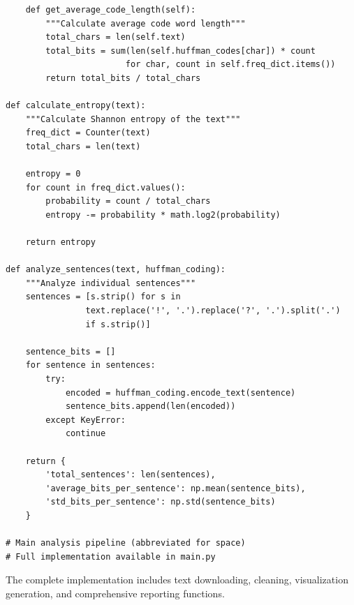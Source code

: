\documentclass[11pt,a4paper]{article}
\begin{document}
\begin{lstlisting}
    def get_average_code_length(self):
        """Calculate average code word length"""
        total_chars = len(self.text)
        total_bits = sum(len(self.huffman_codes[char]) * count 
                        for char, count in self.freq_dict.items())
        return total_bits / total_chars

def calculate_entropy(text):
    """Calculate Shannon entropy of the text"""
    freq_dict = Counter(text)
    total_chars = len(text)
    
    entropy = 0
    for count in freq_dict.values():
        probability = count / total_chars
        entropy -= probability * math.log2(probability)
    
    return entropy

def analyze_sentences(text, huffman_coding):
    """Analyze individual sentences"""
    sentences = [s.strip() for s in 
                text.replace('!', '.').replace('?', '.').split('.') 
                if s.strip()]
    
    sentence_bits = []
    for sentence in sentences:
        try:
            encoded = huffman_coding.encode_text(sentence)
            sentence_bits.append(len(encoded))
        except KeyError:
            continue
    
    return {
        'total_sentences': len(sentences),
        'average_bits_per_sentence': np.mean(sentence_bits),
        'std_bits_per_sentence': np.std(sentence_bits)
    }

# Main analysis pipeline (abbreviated for space)
# Full implementation available in main.py
\end{lstlisting}

The complete implementation includes text downloading, cleaning, visualization generation, and comprehensive reporting functions.
\end{document}
